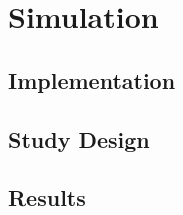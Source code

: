 \section{Simulation}
\label{seq:simulation}


\subsection{Implementation}


\subsection{Study Design}


\subsection{Results}
